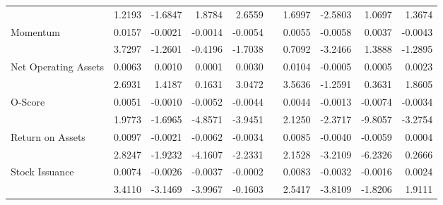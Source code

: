 \begin{table}[h]
{\begin{tabular}{lrrrrlrrrr}
            & 1.2193 & -1.6847 & 1.8784 & 2.6559 &       & 1.6997 & -2.5803 & 1.0697 & 1.3674 \\
      Momentum & 0.0157 & -0.0021 & -0.0014 & -0.0054 &       & 0.0055 & -0.0058 & 0.0037 & -0.0043 \\
            & 3.7297 & -1.2601 & -0.4196 & -1.7038 &       & 0.7092 & -3.2466 & 1.3888 & -1.2895 \\
      Net Operating Assets & 0.0063 & 0.0010 & 0.0001 & 0.0030 &       & 0.0104 & -0.0005 & 0.0005 & 0.0023 \\
            & 2.6931 & 1.4187 & 0.1631 & 3.0472 &       & 3.5636 & -1.2591 & 0.3631 & 1.8605 \\
      O-Score & 0.0051 & -0.0010 & -0.0052 & -0.0044 &       & 0.0044 & -0.0013 & -0.0074 & -0.0034 \\
            & 1.9773 & -1.6965 & -4.8571 & -3.9451 &       & 2.1250 & -2.3717 & -9.8057 & -3.2754 \\
      Return on Assets & 0.0097 & -0.0021 & -0.0062 & -0.0034 &       & 0.0085 & -0.0040 & -0.0059 & 0.0004 \\
            & 2.8247 & -1.9232 & -4.1607 & -2.2331 &       & 2.1528 & -3.2109 & -6.2326 & 0.2666 \\
      Stock Issuance & 0.0074 & -0.0026 & -0.0037 & -0.0002 &       & 0.0083 & -0.0032 & -0.0016 & 0.0024 \\
            & 3.4110 & -3.1469 & -3.9967 & -0.1603 &       & 2.5417 & -3.8109 & -1.8206 & 1.9111 \\
      \bottomrule
      \end{tabular}%
    }
    \label{tab:liq-ff3}%
  \end{table}%

